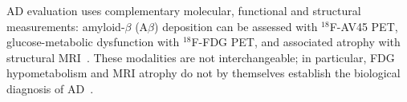 AD evaluation uses complementary molecular, functional and structural measurements: amyloid-$\beta$ (A$\beta$) deposition can be assessed with $^{18}$F-AV45 PET, glucose-metabolic dysfunction with $^{18}$F-FDG PET, and associated atrophy with structural MRI~\cite{ossenkoppele2022amyloid,yan2021sex,haller2023neuroimaging}. These modalities are not interchangeable; in particular, FDG hypometabolism and MRI atrophy do not by themselves establish the biological diagnosis of AD~\cite{jack2024revised}.
